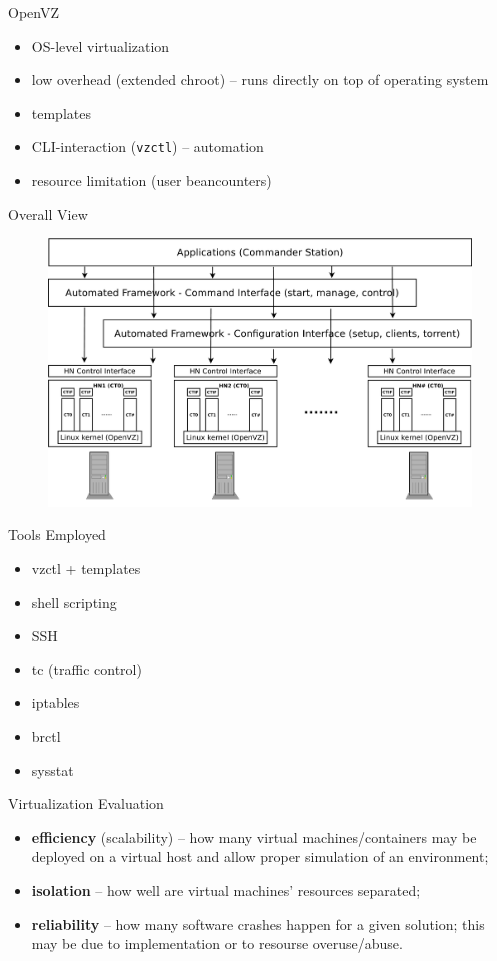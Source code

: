 \documentclass{beamer}
\begin{document}
\begin{frame}{OpenVZ}
  \begin{itemize}
    \item OS-level virtualization
    \item low overhead (extended chroot) -- runs directly on top of operating
    system
    \item templates
    \item CLI-interaction (\texttt{vzctl}) -- automation
    \item resource limitation (user beancounters)
  \end{itemize}
\end{frame}

\begin{frame}{Overall View}
  \begin{figure}
    \includegraphics[scale=0.17]{img/virt-infra-overview}
  \end{figure}
\end{frame}

\begin{frame}{Tools Employed}
  \begin{itemize}
    \item vzctl + templates
    \item shell scripting
    \item SSH
    \item tc (traffic control)
    \item iptables
    \item brctl
    \item sysstat
  \end{itemize}
\end{frame}

\begin{frame}{Virtualization Evaluation}
  \begin{itemize}
    \item \textbf{efficiency} (scalability) -- how many virtual
    machines/containers may be deployed on a virtual host and allow proper
    simulation of an environment;
    \item \textbf{isolation} -- how well are virtual machines' resources
    separated;
    \item \textbf{reliability} -- how many software crashes happen for a given
    solution; this may be due to implementation or to resourse overuse/abuse.
  \end{itemize}
\end{frame}
\end{document}
